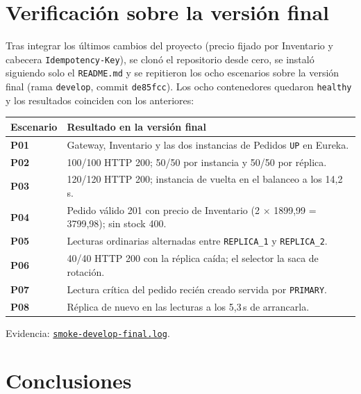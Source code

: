\documentclass[
  spanish,
  a4paper,
  11pt
]{article}
\newcommand{\evid}[1]{\href{https://github.com/yan2005dris-afk/SDCC---microservices-with-gateway-and-loadbalancer/blob/develop/docs/evidencias/#1}{{\urlstyle{tt}\nolinkurl{#1}}}}
\begin{document}
\section{Verificación sobre la versión final}\label{verificacion-final}

Tras integrar los últimos cambios del proyecto (precio fijado por
Inventario y cabecera \texttt{Idempotency-Key}), se clonó el repositorio
desde cero, se instaló siguiendo solo el \texttt{README.md} y se repitieron
los ocho escenarios sobre la versión final (rama \texttt{develop}, commit
\texttt{de85fcc}). Los ocho contenedores quedaron \texttt{healthy} y los
resultados coinciden con los anteriores:

\begin{center}
\renewcommand{\arraystretch}{1.25}
\small
\begin{tabular}{>{\bfseries}l p{}}
\toprule
\textbf{Escenario} & \textbf{Resultado en la versión final} \\
\midrule
P01 & Gateway, Inventario y las dos instancias de Pedidos \texttt{UP} en Eureka. \\
P02 & 100/100 HTTP 200; 50/50 por instancia y 50/50 por réplica. \\
P03 & 120/120 HTTP 200; instancia de vuelta en el balanceo a los 14,2\,s. \\
P04 & Pedido válido 201 con precio de Inventario (2 $\times$ 1899,99 = 3799,98); sin stock 400. \\
P05 & Lecturas ordinarias alternadas entre \texttt{REPLICA\_1} y \texttt{REPLICA\_2}. \\
P06 & 40/40 HTTP 200 con la réplica caída; el selector la saca de rotación. \\
P07 & Lectura crítica del pedido recién creado servida por \texttt{PRIMARY}. \\
P08 & Réplica de nuevo en las lecturas a los 5,3\,s de arrancarla. \\
\bottomrule
\end{tabular}
\end{center}

\noindent Evidencia: \evid{smoke-develop-final.log}.

\section{Conclusiones}\label{conclusiones}
\end{document}
